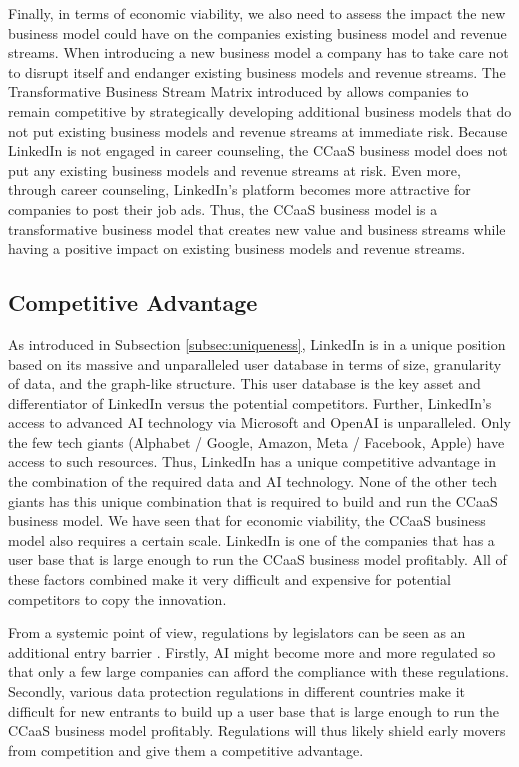 Finally, in terms of economic viability, we also need to assess the impact the new business model could 
have on the companies existing business model and revenue streams. When introducing a new business model 
a company has to take care not to disrupt itself and endanger existing business models and revenue streams.
The Transformative Business Stream Matrix introduced by \citet{schwafertsTransformativeBusinessStream2016}
allows companies to remain competitive by strategically developing additional business models that do not
put existing business models and revenue streams at immediate risk. Because LinkedIn is not engaged in 
career counseling, the CCaaS business model does not put any existing business models and revenue streams
at risk. Even more, through career counseling, LinkedIn's platform becomes more attractive for companies
to post their job ads. Thus, the CCaaS business model is a transformative business model that creates new
value and business streams while having a positive impact on existing business models and revenue streams.

\subsection{Competitive Advantage}

As introduced in Subsection \ref{subsec:uniqueness}, LinkedIn is in a unique position based on its massive 
and unparalleled user database in terms of size, granularity of data, and the graph-like structure. This user
database is the key asset and differentiator of LinkedIn versus the potential competitors. Further, LinkedIn's 
access to advanced AI technology via Microsoft and OpenAI is unparalleled. Only the few tech giants (Alphabet /
Google, Amazon, Meta / Facebook, Apple) have access to such resources. Thus, LinkedIn has a unique competitive
advantage in the combination of the required data and AI technology. None of the other tech giants has this unique 
combination that is required to build and run the CCaaS business model. We have seen that for economic viability,
the CCaaS business model also requires a certain scale. LinkedIn is one of the companies that has a user base
that is large enough to run the CCaaS business model profitably. All of these factors combined make it very   
difficult and expensive for potential competitors to copy the innovation.

From a systemic point of view, regulations by legislators can be seen as an additional entry barrier
\citep{kaserAIpoweredCareerCounseling2023}. Firstly, AI might become more and more regulated so that 
only a few large companies can afford the compliance with these regulations. Secondly, various data protection
regulations in different countries make it difficult for new entrants to build up a user base that is large enough
to run the CCaaS business model profitably. Regulations will thus likely shield early movers from competition
and give them a competitive advantage.

